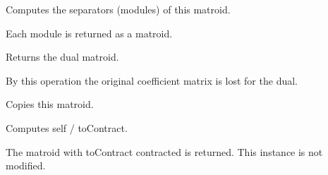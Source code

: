 \documentclass[letterpaper,12pt,english]{sphinxmanual}
\begin{document}
\begin{fulllineitems}
\begin{fulllineitems}
\label{\detokenize{api/modules:cbmpy.fluxmodules.matroid.Matroid.findModules}}
\pysigstartsignatures
\pysiglinewithargsret
{}
{}
{}
\pysigstopsignatures
\sphinxAtStartPar
Computes the separators (modules) of this matroid.

\sphinxAtStartPar
Each module is returned as a matroid.

\end{fulllineitems}


\begin{fulllineitems}
\label{\detokenize{api/modules:cbmpy.fluxmodules.matroid.Matroid.dual}}
\pysigstartsignatures
\pysiglinewithargsret
{}
{}
{}
\pysigstopsignatures
\sphinxAtStartPar
Returns the dual matroid.

\sphinxAtStartPar
By this operation the original coefficient matrix is lost for the dual.

\end{fulllineitems}


\begin{fulllineitems}
\label{\detokenize{api/modules:cbmpy.fluxmodules.matroid.Matroid.copy}}
\pysigstartsignatures
\pysiglinewithargsret
{}
{}
{}
\pysigstopsignatures
\sphinxAtStartPar
Copies this matroid.

\end{fulllineitems}


\begin{fulllineitems}
\label{\detokenize{api/modules:cbmpy.fluxmodules.matroid.Matroid.contract}}
\pysigstartsignatures
\pysiglinewithargsret
{}
{}
{}
\pysigstopsignatures
\sphinxAtStartPar
Computes self / toContract.

\sphinxAtStartPar
The matroid with toContract contracted is returned. This instance is not
modified.


\end{fulllineitems}
\end{fulllineitems}
\end{document}
